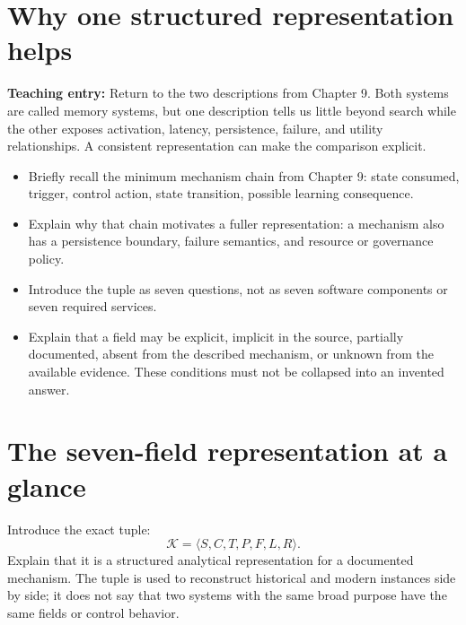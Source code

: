 \section{Why one structured representation helps}
\textbf{Teaching entry:} Return to the two descriptions from Chapter 9. Both systems are called memory systems, but one description tells us little beyond search while the other exposes activation, latency, persistence, failure, and utility relationships. A consistent representation can make the comparison explicit.
\begin{itemize}
  \item Briefly recall the minimum mechanism chain from Chapter 9: state consumed, trigger, control action, state transition, possible learning consequence.
  \item Explain why that chain motivates a fuller representation: a mechanism also has a persistence boundary, failure semantics, and resource or governance policy.
  \item Introduce the tuple as seven questions, not as seven software components or seven required services.
  \item Explain that a field may be explicit, implicit in the source, partially documented, absent from the described mechanism, or unknown from the available evidence. These conditions must not be collapsed into an invented answer.
\end{itemize}

\section{The seven-field representation at a glance}
Introduce the exact tuple:
\[
  \mathcal{K}=\langle S,C,T,P,F,L,R\rangle.
\]
Explain that it is a structured analytical representation for a documented mechanism. The tuple is used to reconstruct historical and modern instances side by side; it does not say that two systems with the same broad purpose have the same fields or control behavior.

